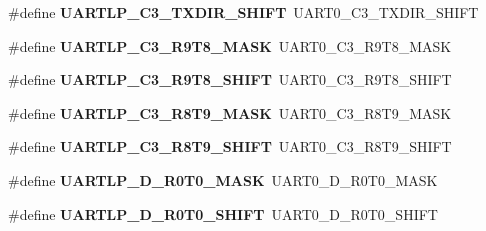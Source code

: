 \begin{DoxyCompactItemize}
\item 
\hypertarget{group___backward___compatibility___symbols_gacb749efddf2ff0881a30fa3b0b0fd6ec}{}\#define {\bfseries U\+A\+R\+T\+L\+P\+\_\+\+C3\+\_\+\+T\+X\+D\+I\+R\+\_\+\+S\+H\+I\+F\+T}~U\+A\+R\+T0\+\_\+\+C3\+\_\+\+T\+X\+D\+I\+R\+\_\+\+S\+H\+I\+F\+T\label{group___backward___compatibility___symbols_gacb749efddf2ff0881a30fa3b0b0fd6ec}

\item 
\hypertarget{group___backward___compatibility___symbols_gaad5e79813f247fac083e627e4125a1b0}{}\#define {\bfseries U\+A\+R\+T\+L\+P\+\_\+\+C3\+\_\+\+R9\+T8\+\_\+\+M\+A\+S\+K}~U\+A\+R\+T0\+\_\+\+C3\+\_\+\+R9\+T8\+\_\+\+M\+A\+S\+K\label{group___backward___compatibility___symbols_gaad5e79813f247fac083e627e4125a1b0}

\item 
\hypertarget{group___backward___compatibility___symbols_gaaffea46f675353dc12aa3b19a9da33b0}{}\#define {\bfseries U\+A\+R\+T\+L\+P\+\_\+\+C3\+\_\+\+R9\+T8\+\_\+\+S\+H\+I\+F\+T}~U\+A\+R\+T0\+\_\+\+C3\+\_\+\+R9\+T8\+\_\+\+S\+H\+I\+F\+T\label{group___backward___compatibility___symbols_gaaffea46f675353dc12aa3b19a9da33b0}

\item 
\hypertarget{group___backward___compatibility___symbols_gabe3e5842a9d28fcc4699ab569b79d2d6}{}\#define {\bfseries U\+A\+R\+T\+L\+P\+\_\+\+C3\+\_\+\+R8\+T9\+\_\+\+M\+A\+S\+K}~U\+A\+R\+T0\+\_\+\+C3\+\_\+\+R8\+T9\+\_\+\+M\+A\+S\+K\label{group___backward___compatibility___symbols_gabe3e5842a9d28fcc4699ab569b79d2d6}

\item 
\hypertarget{group___backward___compatibility___symbols_gadd1520225db488c74cb9f850c1bf1e99}{}\#define {\bfseries U\+A\+R\+T\+L\+P\+\_\+\+C3\+\_\+\+R8\+T9\+\_\+\+S\+H\+I\+F\+T}~U\+A\+R\+T0\+\_\+\+C3\+\_\+\+R8\+T9\+\_\+\+S\+H\+I\+F\+T\label{group___backward___compatibility___symbols_gadd1520225db488c74cb9f850c1bf1e99}

\item 
\hypertarget{group___backward___compatibility___symbols_ga6c0de61b1bd7ca4438ffc57fe10550ef}{}\#define {\bfseries U\+A\+R\+T\+L\+P\+\_\+\+D\+\_\+\+R0\+T0\+\_\+\+M\+A\+S\+K}~U\+A\+R\+T0\+\_\+\+D\+\_\+\+R0\+T0\+\_\+\+M\+A\+S\+K\label{group___backward___compatibility___symbols_ga6c0de61b1bd7ca4438ffc57fe10550ef}

\item 
\hypertarget{group___backward___compatibility___symbols_gab2cd42b68d606b5ba4d1b496d41a9a1a}{}\#define {\bfseries U\+A\+R\+T\+L\+P\+\_\+\+D\+\_\+\+R0\+T0\+\_\+\+S\+H\+I\+F\+T}~U\+A\+R\+T0\+\_\+\+D\+\_\+\+R0\+T0\+\_\+\+S\+H\+I\+F\+T\label{group___backward___compatibility___symbols_gab2cd42b68d606b5ba4d1b496d41a9a1a}


\end{DoxyCompactItemize}

